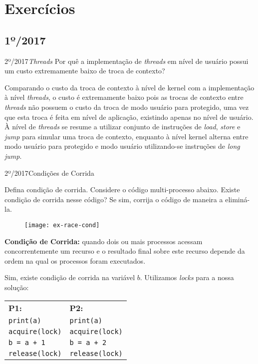 \chapter{Exercícios}


\section{1º/2017}
\begin{exercicio}
  {2º/2017}{\textit{Threads}}
  {Por quê a implementação de \textit{threads} em nível de usuário possui um custo extremamente baixo de troca de contexto?}

  Comparando o custo da troca de contexto à nível de kernel com a implementação à nível \textit{threads}, o custo é extremamente baixo pois as trocas de contexto entre \textit{threads} não possuem o custo da troca de modo usuário para protegido, uma vez que esta troca é feita em nível de aplicação, existindo apenas no nível de usuário. À nível de \textit{threads} se resume a utilizar conjunto de instruções de \textit{load}, \textit{store} e \textit{jump} para simular uma troca de contexto, enquanto à nível kernel alterna entre modo usuário para protegido e modo usuário utilizando-se instruções de \textit{long jump}.
\end{exercicio}

\begin{exercicio}
  {2º/2017}{Condições de Corrida}
  {Defina condição de corrida. Considere o código multi-processo abaixo. Existe condição de corrida nesse código? Se sim, corrija o código de maneira a eliminá-la.
  \begin{figure}[!H]
    \centering
    \texttt{[image: ex-race-cond]}
  \end{figure}}

  \textbf{Condição de Corrida:} quando dois ou mais processos acessam concorrentemente um recurso e o resultado final sobre este recurso depende da ordem na qual os processos foram executados.

  Sim, existe condição de corrida na variável $b$. Utilizamos \textit{locks} para a nossa solução:

  \begin{table}[!H]
    \centering
    \begin{tabular}{l|l}
      \textbf{P1:}            & \textbf{P2:} \\
      \texttt{print(a)}       & \texttt{print(a)} \\
      \texttt{acquire(lock)}  & \texttt{acquire(lock)} \\
      \texttt{b = a + 1}      & \texttt{b = a + 2} \\
      \texttt{release(lock)}  & \texttt{release(lock)}\\
    \end{tabular}
  \end{table}
\end{exercicio}

